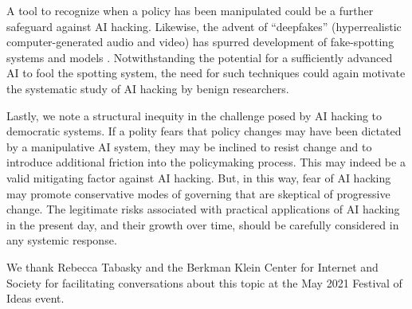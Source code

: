 \documentclass[nonacm,12pt]{acmart}
\begin{document}
A tool to recognize when a policy has been manipulated could be a further safeguard against AI hacking.  Likewise, the advent of ``deepfakes'' (hyperrealistic computer-generated audio and video) has spurred development of fake-spotting systems and models \cite{wang_fakespotter_2020}. Notwithstanding the potential for a sufficiently advanced AI to fool the spotting system, the need for such techniques could again motivate the systematic study of AI hacking by benign researchers.

Lastly, we note a structural inequity in the challenge posed by AI hacking to democratic systems. If a polity fears that policy changes may have been dictated by a manipulative AI system, they may be inclined to resist change and to introduce additional friction into the policymaking process. This may indeed be a valid mitigating factor against AI hacking.  But, in this way, fear of AI hacking may promote conservative modes of governing that are skeptical of progressive change. The legitimate risks associated with practical applications of AI hacking in the present day, and their growth over time, should be carefully considered in any systemic response.

\begin{acks}
We thank Rebecca Tabasky and the Berkman Klein Center for Internet and Society for facilitating conversations about this topic at the May 2021 Festival of Ideas event.
\end{acks}



\end{document}
